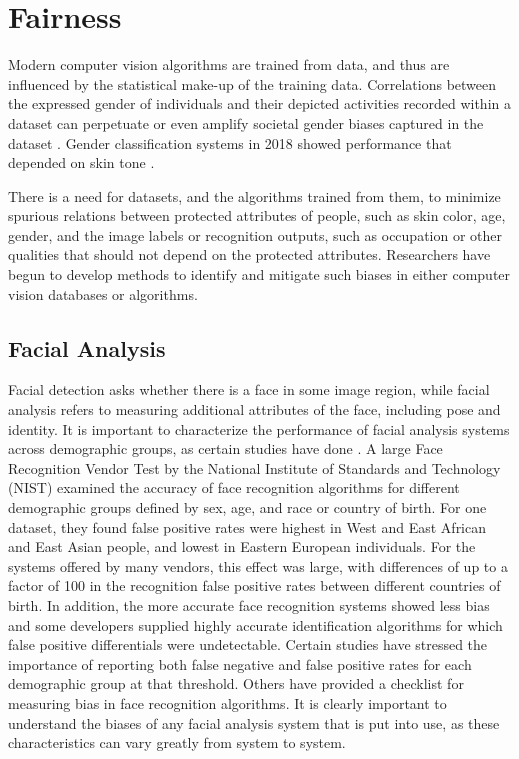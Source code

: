 \section{Fairness}
\label{sect:fairness}

Modern computer vision algorithms are trained from data, and thus are
influenced by the statistical make-up of the training data.
Correlations between the expressed gender of
individuals and their depicted activities recorded within a dataset
can perpetuate or even amplify societal gender biases captured in the dataset \cite{Zhao2017,dalessandro2017,Noble2018}.  Gender classification systems in 2018 showed performance that depended on skin tone \cite{Buolamwini2018}.


There is a need for datasets, and the algorithms trained from them, to minimize spurious relations between protected attributes of people, such as skin color, age, gender, and the image labels or recognition outputs, such as occupation or other qualities that should not depend on the protected attributes.
Researchers have begun to develop methods to identify and mitigate such biases in either computer vision databases or algorithms.

\subsection{Facial Analysis}

Facial detection asks whether there is a face in some image region, while facial analysis refers to measuring additional attributes of the face, including pose and identity.  It is important to characterize the performance of facial analysis systems across demographic groups, as certain studies have done \cite{Klare2012}.  A large Face Recognition Vendor Test by the National Institute of Standards and Technology (NIST) \cite{Grother2019}  examined the accuracy of face recognition algorithms for different demographic groups defined by sex, age, and race or country of birth. For one dataset, they found
false positive rates were highest in West and East African and East Asian people, and lowest in Eastern European individuals. For the systems offered by many vendors, this effect was large, with differences of up to a factor of 100 in the recognition false positive rates between different countries of birth. In addition, the more accurate face recognition systems showed less bias and
some developers supplied highly accurate identification algorithms for
which false positive differentials were undetectable.
Certain studies \cite{Grother2019} have stressed the importance of reporting both false negative and false positive rates for each
demographic group at that threshold. Others \cite{Cavazos2021} have provided
a checklist for measuring bias in face recognition algorithms.  It is clearly important to understand the biases of any facial analysis system that is put into use, as these characteristics can vary greatly from system to system.

